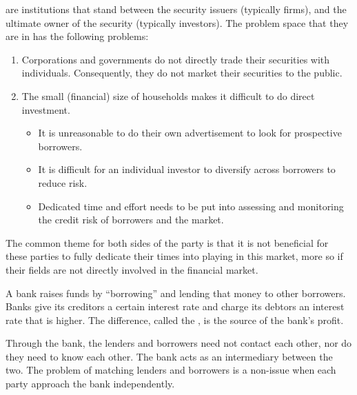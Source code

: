 \documentclass[notoc,notitlepage]{tufte-book}
\begin{document}
 are institutions that stand
between the security issuers (typically firms), and the
ultimate owner of the security (typically investors).
The problem space that they are in has the following problems:
\begin{enumerate}
  \item Corporations and governments do not directly trade
    their securities with individuals. Consequently,
    they do not market their securities to the public.
  \item The small (financial) size of households makes it difficult
    to do direct investment.
    \begin{itemize}
      \item It is unreasonable to do their own advertisement
        to look for prospective borrowers.
      \item It is difficult for an individual investor to diversify
        across borrowers to reduce risk.
      \item Dedicated time and effort needs to be put into
        assessing and monitoring the credit risk of borrowers and
        the market.
    \end{itemize}
\end{enumerate}
The common theme for both sides of the party is that it is not
beneficial for these parties to fully dedicate their times into
playing in this market, more so if their fields are not directly
involved in the financial market.

\begin{eg}
  A bank raises funds by ``borrowing''  and lending that money to other borrowers.
  Banks give its creditors a certain interest rate and charge
  its debtors an interest rate that is higher.
  The difference, called the , is the source
  of the bank's profit.

  Through the bank, the lenders and borrowers need not contact
  each other, nor do they need to know each other. The bank
  acts as an intermediary between the two.
  The problem of matching lenders and borrowers is a non-issue
  when each party approach the bank independently.
\end{eg}
\end{document}
